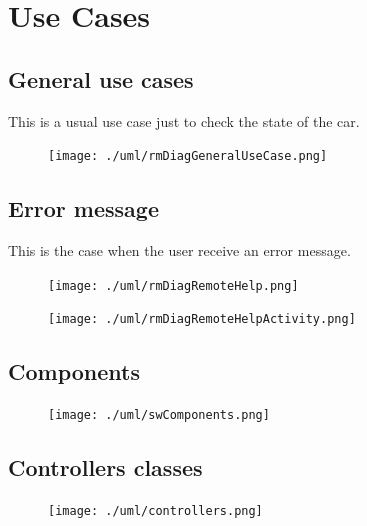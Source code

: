 \documentclass{scrreprt}
\begin{document}
\chapter{Use Cases}

\section{General use cases}
This is a usual use case just to check the state of the car.
\begin{figure}[!htb]
\center
\texttt{[image: ./uml/rmDiagGeneralUseCase.png]}
\end{figure}

\section{Error message}
This is the case when the user receive an error message.
\begin{figure}[!htb]
\center
\texttt{[image: ./uml/rmDiagRemoteHelp.png]}
\end{figure}

\begin{figure}[!htb]
\center
\texttt{[image: ./uml/rmDiagRemoteHelpActivity.png]}
\end{figure}

\section{Components}
\begin{figure}[!htb]
\center
\texttt{[image: ./uml/swComponents.png]}
\end{figure}
\newpage
\section{Controllers classes}
\begin{figure}[!htb]
\center
\texttt{[image: ./uml/controllers.png]}
\end{figure}
\end{document}
